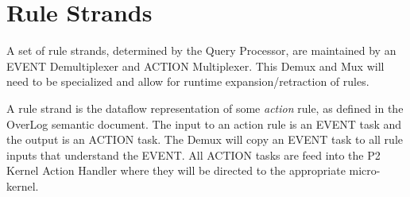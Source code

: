 \documentclass[12pt]{article}
\begin{document}
\section{Rule Strands}
A set of rule strands, determined by the Query Processor, are maintained by an
EVENT Demultiplexer and ACTION Multiplexer. This Demux and Mux will need to
be specialized and allow for runtime expansion/retraction of rules. 

A rule strand is the dataflow representation of some \emph{action} rule, as defined in 
the OverLog semantic document. The input to an action rule is an EVENT task and
the output is an ACTION task. The Demux will copy an EVENT task to all rule inputs
that understand the EVENT. All ACTION tasks are feed into the P2 Kernel Action Handler
where they will be directed to the appropriate micro-kernel.
\end{document}
